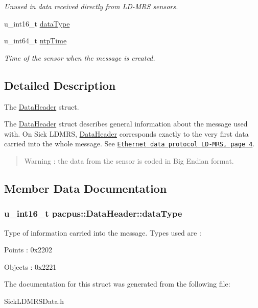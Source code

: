 \begin{DoxyCompactItemize}
\begin{DoxyCompactList}\small\item\em Unused in data received directly from L\-D-\/\-M\-R\-S sensors. \end{DoxyCompactList}\item 
u\-\_\-int16\-\_\-t \hyperlink{structpacpus_1_1DataHeader_a2e11011e26d0344376cb812b5b858a64}{data\-Type}
\item 
\hypertarget{structpacpus_1_1DataHeader_a2c9728a402325ccadd4c69f3854e9eef}{u\-\_\-int64\-\_\-t \hyperlink{structpacpus_1_1DataHeader_a2c9728a402325ccadd4c69f3854e9eef}{ntp\-Time}}\label{structpacpus_1_1DataHeader_a2c9728a402325ccadd4c69f3854e9eef}

\begin{DoxyCompactList}\small\item\em Time of the sensor when the message is created. \end{DoxyCompactList}\end{DoxyCompactItemize}


\subsection{Detailed Description}
The \hyperlink{structpacpus_1_1DataHeader}{Data\-Header} struct. 

The \hyperlink{structpacpus_1_1DataHeader}{Data\-Header} struct describes general information about the message used with. On Sick L\-D\-M\-R\-S, \hyperlink{structpacpus_1_1DataHeader}{Data\-Header} corresponds exactly to the very first data carried into the whole message. See \href{docs/BAMessdatenProtokoll_LDMRSen_8014492_20110601.pdf}{\tt Ethernet data protocol L\-D-\/\-M\-R\-S, page 4}. \begin{quotation}
Warning \-: the data from the sensor is coded in Big Endian format. \end{quotation}


\subsection{Member Data Documentation}
\hypertarget{structpacpus_1_1DataHeader_a2e11011e26d0344376cb812b5b858a64}{
\subsubsection[{data\-Type}]{\setlength{\rightskip}{0pt plus 5cm}u\-\_\-int16\-\_\-t pacpus\-::\-Data\-Header\-::data\-Type}}\label{structpacpus_1_1DataHeader_a2e11011e26d0344376cb812b5b858a64}
Type of information carried into the message. Types used are \-:
\begin{DoxyItemize}
\item Points \-: 0x2202
\item Objects \-: 0x2221 
\end{DoxyItemize}

The documentation for this struct was generated from the following file\-:\begin{DoxyCompactItemize}
\item 
Sick\-L\-D\-M\-R\-S\-Data.\-h\end{DoxyCompactItemize}
